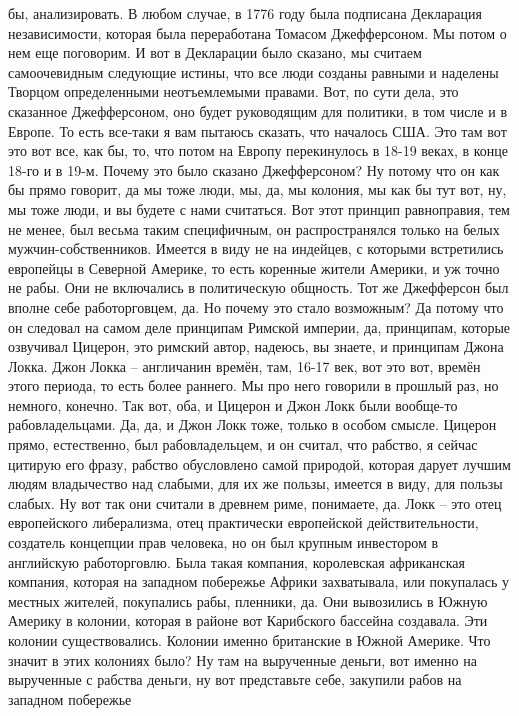 бы, анализировать. В любом случае, в 1776 году была подписана Декларация
независимости, которая была переработана Томасом Джефферсоном. Мы потом о нем
еще поговорим. И вот в Декларации было сказано, мы считаем самоочевидным
следующие истины, что все люди созданы равными и наделены Творцом определенными
неотъемлемыми правами. Вот, по сути дела, это сказанное Джефферсоном, оно будет
руководящим для политики, в том числе и в Европе. То есть все-таки я вам пытаюсь
сказать, что началось США. Это там вот это вот все, как бы, то, что потом на
Европу перекинулось в 18-19 веках, в конце 18-го и в 19-м. Почему это было
сказано Джефферсоном? Ну потому что он как бы прямо говорит, да мы тоже люди,
мы, да, мы колония, мы как бы тут вот, ну, мы тоже люди, и вы будете с нами
считаться. Вот этот принцип равноправия, тем не менее, был весьма таким
специфичным, он распространялся только на белых мужчин-собственников. Имеется в
виду не на индейцев, с которыми встретились европейцы в Северной Америке, то
есть коренные жители Америки, и уж точно не рабы. Они не включались в
политическую общность. Тот же Джефферсон был вполне себе работорговцем, да. Но
почему это стало возможным? Да потому что он следовал на самом деле принципам
Римской империи, да, принципам, которые озвучивал Цицерон, это римский автор,
надеюсь, вы знаете, и принципам Джона Локка. Джон Локка – англичанин времён,
там, 16-17 век, вот это вот, времён этого периода, то есть более раннего. Мы про
него говорили в прошлый раз, но немного, конечно. Так вот, оба, и Цицерон и Джон
Локк были вообще-то рабовладельцами. Да, да, и Джон Локк тоже, только в особом
смысле. Цицерон прямо, естественно, был рабовладельцем, и он считал, что
рабство, я сейчас цитирую его фразу, рабство обусловлено самой природой, которая
дарует лучшим людям владычество над слабыми, для их же пользы, имеется в виду,
для пользы слабых. Ну вот так они считали в древнем риме, понимаете, да. Локк –
это отец европейского либерализма, отец практически европейской
действительности, создатель концепции прав человека, но он был крупным
инвестором в английскую работорговлю. Была такая компания, королевская
африканская компания, которая на западном побережье Африки захватывала, или
покупалась у местных жителей, покупались рабы, пленники, да. Они вывозились в
Южную Америку в колонии, которая в районе вот Карибского бассейна создавала. Эти
колонии существовались. Колонии именно британские в Южной Америке. Что значит в
этих колониях было? Ну там на вырученные деньги, вот именно на вырученные с
рабства деньги, ну вот представьте себе, закупили рабов на западном побережье
